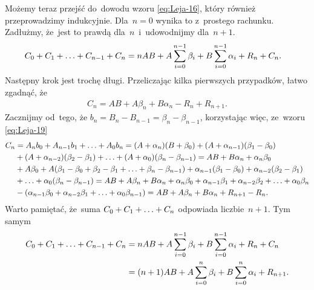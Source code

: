 \documentclass[a4paper,11pt]{article}
\begin{document}
Możemy teraz przejść do~dowodu wzoru \eqref{eq:Leja-16}, który również
przeprowadzimy indukcyjnie. Dla~$n = 0$ wynika to z~prostego rachunku.
Zadłużmy, że~jest to prawdą dla~$n$~i~udowodnijmy dla~$n + 1$.
\begin{equation}
  \label{eq:Leja-24}
  \begin{split}
    C_{ 0 } + C_{ 1 } + \ldots + C_{ n - 1 } + C_{ n } &= n AB + A \sum_{
      i = 0 }^{ n - 1 } \beta_{ i } + B \sum_{ i = 0 }^{ n - 1 } \alpha_{ i
    } + R_{ n } + C_{ n }.
  \end{split}
\end{equation}
Następny krok jest trochę długi. Przeliczając kilka pierwszych
przypadków, łatwo zgadnąć, że
\begin{equation}
  \label{eq:Leja-25}
  \begin{split}
    C_{ n } = AB + A \beta_{ n } + B \alpha_{ n } - R_{ n } + R_{ n + 1 }.
  \end{split}
\end{equation}
Zacznijmy od~tego, że
$b_{ n } = B_{ n } - B_{ n - 1 } = \beta_{ n } - \beta_{ n - 1 }$,
korzystając więc, ze~wzoru \eqref{eq:Leja-19}
\begin{equation}
  \label{eq:Leja-26}
  \begin{split}
    C_{ n } &= A_{ n } b_{ 0 } + A_{ n - 1 } b_{ 1 } + \ldots + A_{ 0 }
    b_{ n } = ( A + \alpha_{ n } ) ( B + \beta_{ 0 } ) + ( A + \alpha_{ n - 1
    } )
    ( \beta_{ 1 } - \beta_{ 0 } ) \\
    &+ ( A + \alpha_{ n - 2 } )( \beta_{ 2 } - \beta_{ 1 } ) + \ldots + ( A +
    \alpha_{ 0 } ) ( \beta_{ n } - \beta_{ n - 1 } )
    = AB + B \alpha_{ n } + \alpha_{ n } \beta_{ 0 } \\
    &+ A \beta_{ 0 } + A ( \beta_{ 1 } - \beta_{ 0 } + \beta_{ 2 } - \beta_{ 1 }
    + \ldots + \beta_{ n } - \beta_{ n - 1 } ) + \alpha_{ n - 1 } ( \beta_{ 1 } -
    \beta_{ 0 } )
    + \alpha_{ n - 2 } ( \beta_{ 2 } - \beta_{ 1 } ) \\
    & + \ldots + \alpha_{ 0 } ( \beta_{ n } - \beta_{ n - 1 } ) = AB + A \beta_{ n
    } + B \alpha_{ n } + \alpha_{ n } \beta_{ 0 } + \alpha_{ n - 1 } \beta_{ 1 } +
    \alpha_{ n - 2 } \beta_{ 2 } + \ldots + \alpha_{ 0 } \beta_{ n } \\
    & - ( \alpha_{ n - 1 } \beta_{ 0 } + \alpha_{ n - 2 } \beta_{ 1 } + \ldots +
    \alpha_{ 0 } \beta_{ n - 1 } ) = AB + A \beta_{ n } + B \alpha_{ n } + R_{ n
      + 1 } - R_{ n }.
  \end{split}
\end{equation}
Warto pamiętać, że~suma $C_{ 0 } + C_{ 1 } + \ldots + C_{ n }$ odpowiada
liczbie~$n + 1$. Tym samym
\begin{equation}
  \label{eq:Leja-27}
  \begin{split}
    C_{ 0 } + C_{ 1 } + \ldots + C_{ n - 1 } + C_{ n } &= n AB + A \sum_{
      i = 0 }^{ n - 1 } \beta_{ i } + B \sum_{ i = 0 }^{ n - 1 } \alpha_{ i
    } + R_{ n } + C_{ n } \\
    &= ( n + 1 ) AB + A \sum_{ i = 0 }^{ n } \beta_{ i } + B \sum_{ i =
      0 }^{ n } \alpha_{ i } + R_{ n + 1 }.
  \end{split}
\end{equation}
\end{document}
